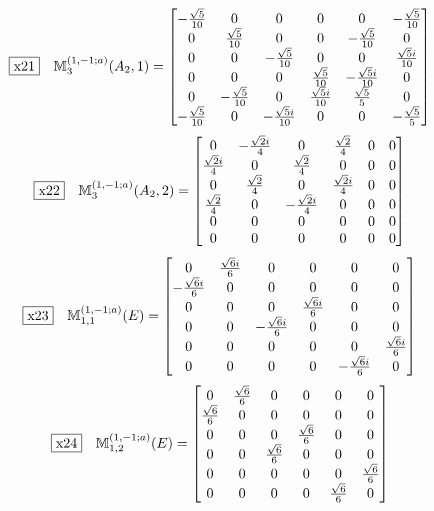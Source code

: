 \documentclass[fleqn,10pt,landscape]{jsarticle}
\begin{document}
\begin{dmath*}
\fbox{x21}\quad \mathbb{M}_{3}^{(1,-1;a)}(A_{2},1)=\begin{bmatrix} - \frac{\sqrt{5}}{10} & 0 & 0 & 0 & 0 & - \frac{\sqrt{5}}{10} \\ 0 & \frac{\sqrt{5}}{10} & 0 & 0 & - \frac{\sqrt{5}}{10} & 0 \\ 0 & 0 & - \frac{\sqrt{5}}{10} & 0 & 0 & \frac{\sqrt{5} i}{10} \\ 0 & 0 & 0 & \frac{\sqrt{5}}{10} & - \frac{\sqrt{5} i}{10} & 0 \\ 0 & - \frac{\sqrt{5}}{10} & 0 & \frac{\sqrt{5} i}{10} & \frac{\sqrt{5}}{5} & 0 \\ - \frac{\sqrt{5}}{10} & 0 & - \frac{\sqrt{5} i}{10} & 0 & 0 & - \frac{\sqrt{5}}{5} \end{bmatrix}
\end{dmath*}
\begin{dmath*}
\fbox{x22}\quad \mathbb{M}_{3}^{(1,-1;a)}(A_{2},2)=\begin{bmatrix} 0 & - \frac{\sqrt{2} i}{4} & 0 & \frac{\sqrt{2}}{4} & 0 & 0 \\ \frac{\sqrt{2} i}{4} & 0 & \frac{\sqrt{2}}{4} & 0 & 0 & 0 \\ 0 & \frac{\sqrt{2}}{4} & 0 & \frac{\sqrt{2} i}{4} & 0 & 0 \\ \frac{\sqrt{2}}{4} & 0 & - \frac{\sqrt{2} i}{4} & 0 & 0 & 0 \\ 0 & 0 & 0 & 0 & 0 & 0 \\ 0 & 0 & 0 & 0 & 0 & 0 \end{bmatrix}
\end{dmath*}
\begin{dmath*}
\fbox{x23}\quad \mathbb{M}_{1,1}^{(1,-1;a)}(E)=\begin{bmatrix} 0 & \frac{\sqrt{6} i}{6} & 0 & 0 & 0 & 0 \\ - \frac{\sqrt{6} i}{6} & 0 & 0 & 0 & 0 & 0 \\ 0 & 0 & 0 & \frac{\sqrt{6} i}{6} & 0 & 0 \\ 0 & 0 & - \frac{\sqrt{6} i}{6} & 0 & 0 & 0 \\ 0 & 0 & 0 & 0 & 0 & \frac{\sqrt{6} i}{6} \\ 0 & 0 & 0 & 0 & - \frac{\sqrt{6} i}{6} & 0 \end{bmatrix}
\end{dmath*}
\begin{dmath*}
\fbox{x24}\quad \mathbb{M}_{1,2}^{(1,-1;a)}(E)=\begin{bmatrix} 0 & \frac{\sqrt{6}}{6} & 0 & 0 & 0 & 0 \\ \frac{\sqrt{6}}{6} & 0 & 0 & 0 & 0 & 0 \\ 0 & 0 & 0 & \frac{\sqrt{6}}{6} & 0 & 0 \\ 0 & 0 & \frac{\sqrt{6}}{6} & 0 & 0 & 0 \\ 0 & 0 & 0 & 0 & 0 & \frac{\sqrt{6}}{6} \\ 0 & 0 & 0 & 0 & \frac{\sqrt{6}}{6} & 0 \end{bmatrix}
\end{dmath*}
\end{document}
